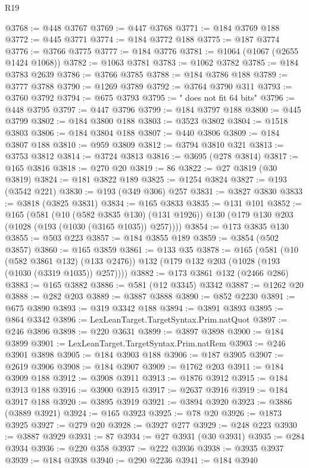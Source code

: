 \begin{lexlean}{R19}
\begin{coremodule}
@3768 := @448 @3767
@3769 := @447 @3768
@3771 := @184 @3769 @188
@3772 := @445 @3771
@3774 := @184 @3772 @188
@3775 := @187 @3774
@3776 := @3766 @3775
@3777 := @184 @3776
@3781 := @1064 (@1067 (@2655 @1424 @1068))
@3782 := @1063 @3781
@3783 := @1062 @3782
@3785 := @184 @3783 @2639
@3786 := @3766 @3785
@3788 := @184 @3786 @188
@3789 := @3777 @3788
@3790 := @1269 @3789
@3792 := @3764 @3790 @311
@3793 := @3760 @3792
@3794 := @675 @3793
@3795 := " does not fit 64 bits"
@3796 := @448 @3795
@3797 := @447 @3796
@3799 := @184 @3797 @188
@3800 := @445 @3799
@3802 := @184 @3800 @188
@3803 := @3523 @3802
@3804 := @1518 @3803
@3806 := @184 @3804 @188
@3807 := @440 @3806
@3809 := @184 @3807 @188
@3810 := @959 @3809
@3812 := @3794 @3810 @321
@3813 := @3753 @3812
@3814 := @3724 @3813
@3816 := @3695 (@278 @3814)
@3817 := @165 @3816
@3818 := @270 @20
@3819 := 86
@3822 := @27 @3819 (@30 @3819)
@3824 := @181 @3822 @189
@3825 := @1254 @3824
@3827 := @193 (@3542 @221)
@3830 := @193 (@349 @306) @257
@3831 := @3827 @3830
@3833 := @3818 (@3825 @3831)
@3834 := @165 @3833
@3835 := @131 @101
@3852 := @165
    (@581
      (@10 (@582 @3835 @130) (@131 @1926))
      @130
      (@179 @130 @203 (@1028 (@193 (@1030 (@3165 @1035)) @257))))
@3854 := @173 @3835 @130
@3855 := @503 @223
@3857 := @184 @3855 @189
@3859 := @3854 (@502 @3857)
@3860 := @165 @3859
@3861 := @133 @35
@3878 := @165
    (@581
      (@10 (@582 @3861 @132) (@133 @2476))
      @132
      (@179 @132 @203 (@1028 (@193 (@1030 (@3319 @1035)) @257))))
@3882 := @173 @3861 @132 (@2466 @286)
@3883 := @165 @3882
@3886 := @581 (@12 @3345) @3342
@3887 := @1262 @20
@3888 := @282 @203
@3889 := @3887 @3888
@3890 := @852 @2230
@3891 := @675 @3890
@3893 := @319 @3342 @188
@3894 := @3891 @3893
@3895 := @864 @3342
@3896 := LexLeanTarget.TargetSyntax.Prim.natQuot
@3897 := @246 @3896
@3898 := @220 @3631
@3899 := @3897 @3898
@3900 := @184 @3899
@3901 := LexLeanTarget.TargetSyntax.Prim.natRem
@3903 := @246 @3901 @3898
@3905 := @184 @3903 @188
@3906 := @187 @3905
@3907 := @2619 @3906
@3908 := @184 @3907
@3909 := @1762 @203
@3911 := @184 @3909 @188
@3912 := @3908 @3911
@3913 := @1876 @3912
@3915 := @184 @3913 @188
@3916 := @3900 @3915
@3917 := @2637 @3916
@3919 := @184 @3917 @188
@3920 := @3895 @3919
@3921 := @3894 @3920
@3923 := @3886 (@3889 @3921)
@3924 := @165 @3923
@3925 := @78 @20
@3926 := @1873 @3925
@3927 := @279 @20
@3928 := @3927 @277
@3929 := @248 @223
@3930 := @3887 @3929
@3931 := 87
@3934 := @27 @3931 (@30 @3931)
@3935 := @284 @3934
@3936 := @220 @358
@3937 := @222 @3936
@3938 := @3935 @3937
@3939 := @184 @3938
@3940 := @290 @2236
@3941 := @184 @3940

\end{coremodule}
\end{lexlean}
